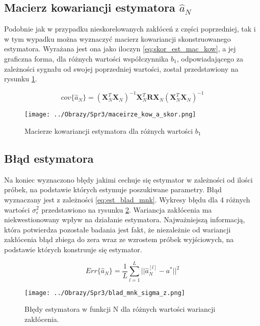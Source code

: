 \documentclass[12pt,a4paper]{article}
\begin{document}
\subsection{Macierz kowariancji estymatora $\hat{a}_{N}$}
Podobnie jak w przypadku nieskorelowanych zakłóceń z części poprzedniej, tak i w tym wypadku można wyznaczyć macierz kowariancji skonstruowanego estymatora.
Wyrażana jest ona jako iloczyn \ref{eq:skor_est_mac_kow}, a jej graficzna forma, dla różnych wartości współczynnika $b_{1}$, odpowiadającego za zależności sygnału od swojej poprzedniej wartości, został przedstawiony na rysunku \ref{fig:mac_kow_skor}.

\begin{equation}\label{eq:skor_est_mac_kow}
cov\{\hat{a}_{N}\}=(\boldsymbol{X}_{N}^{T}\boldsymbol{X}_{N})^{-1}\boldsymbol{X}_{N}^{T}\boldsymbol{R}\boldsymbol{X}_{N}(\boldsymbol{X}_{N}^{T}\boldsymbol{X}_{N})^{-1}
\end{equation}

\begin{figure}[H]
\centering
\texttt{[image: ../Obrazy/Spr3/maceirze\_kow\_a\_skor.png]} 
\caption{Macierze kowariancji estymatora dla różnych wartości $b_{1}$}
\label{fig:mac_kow_skor}
\end{figure}

\subsection{Błąd estymatora}
Na koniec wyznaczono błędy jakimi cechuje się estymator w zależności od ilości próbek, na podstawie których estymuje poszukiwane parametry.
Błąd wyznaczany jest z zależności \ref{eq:est_blad_mnk}.
Wykresy błędu dla 4 różnych wartości $\sigma_{\epsilon}^{2}$ przedstawiono na rysunku \ref{fig:blad_mnk_sigma_z}.
Wariancja zakłócenia ma niekwestionowany wpływ na działanie estymatora.
Najważniejszą informacją, która potwierdza pozostałe badania jest fakt, że niezależnie od wariancji zakłócenia błąd zbiega do zera wraz ze wzrostem próbek wyjściowych, na podstawie których konstruuje się estymator.

\begin{equation}\label{eq:est_blad_mnk}
Err\{\hat{a}_{N}\}=\frac{1}{L}\sum_{l=1}^{L}||\hat{a}_{N}^{[l]}-a^{*}||^{2}
\end{equation}

\begin{figure}[H]
\centering
\texttt{[image: ../Obrazy/Spr3/blad\_mnk\_sigma\_z.png]} 
\caption{Błędy estymatora w funkcji N dla różnych wartości wariancji zakłócenia.}
\label{fig:blad_mnk_sigma_z}
\end{figure}
\end{document}
